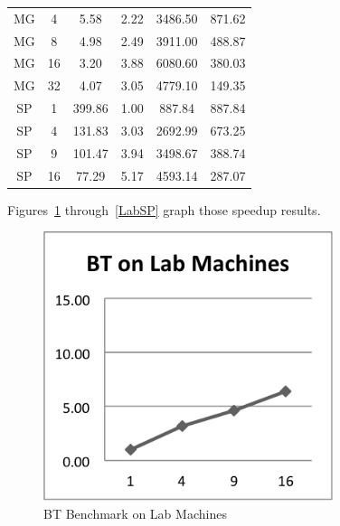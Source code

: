 \documentclass{acm_proc_article-sp}
\begin{document}
\begin{table}[tbp]
\begin{tabular}{ c | c || c | c | c | c }
    MG    & 4     & 5.58  & 2.22  & 3486.50 & 871.62 \\
    MG    & 8     & 4.98  & 2.49  & 3911.00  & 488.87 \\
    MG    & 16    & 3.20   & 3.88  & 6080.60 & 380.03 \\
    MG    & 32    & 4.07  & 3.05  & 4779.10 & 149.35 \\
    SP    & 1     & 399.86 & 1.00  & 887.84 & 887.84 \\
    SP    & 4     & 131.83 & 3.03  & 2692.99 & 673.25 \\
    SP    & 9     & 101.47 & 3.94  & 3498.67 & 388.74 \\
    SP    & 16    & 77.29 & 5.17  & 4593.14 & 287.07 \\
\end{tabular}
\end{table}

Figures~\ref{LabBT} through~\ref{LabSP} graph those speedup results.

\begin{figure}[tbp]
  \centering
  \caption{BT Benchmark on Lab Machines}
	\label{LabBT}
  \includegraphics[width=20pc]{Pics-Lab/BT.png}
\end{figure}
\end{document}
